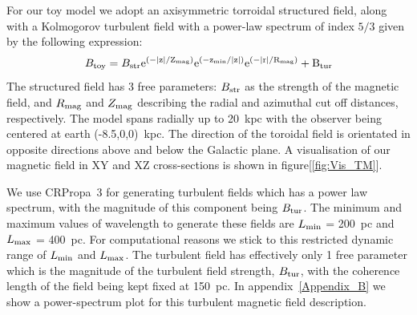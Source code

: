 \documentclass[usenatbib]{mnras}
\begin{document}
For our toy model we adopt an axisymmetric torroidal structured field, along with a Kolmogorov turbulent field with a power-law spectrum of index $5/3$ given by the following expression:
\begin{equation}\label{TM_equation}
B_{\rm{toy}}= B_{\rm{str}}\rm{e}^{{(-|z|}/Z_{\rm{mag}})} \rm{e}^{(-z_{\rm{min}}/|z|)}\rm{e}^{(-|r|/R_{\rm{mag}})} + B_{\rm{tur}}
\end{equation}
The structured field has 3 free parameters: $B_{\rm str}$ as the strength of the magnetic field, and $R_{\rm {mag}}$ and $Z_{\rm {mag}}$ describing the radial and azimuthal cut off distances, respectively. The model spans radially up to 20~kpc with the observer being centered at earth (-8.5,0,0)~kpc. The direction of the toroidal field is orientated in opposite directions above and below the Galactic plane. A visualisation of our magnetic field in XY and XZ cross-sections is shown in figure[\ref{fig:Vis_TM}]. 

We use CRPropa~3 \cite{CRPropa3_2016} for generating turbulent fields which has a power law spectrum, with the magnitude of this component being $B_{\rm{tur}}$. 
The minimum and maximum values of wavelength to generate these fields are  $L_{\rm min}$ = 200~pc and $L_{\rm max}$ = 400~pc. For computational reasons we stick to this restricted dynamic range of $L_{\rm min}$ and $L_{\rm max}$. The turbulent field has effectively only 1 free parameter which is the magnitude of the turbulent field strength, $ B_{\rm tur}$, with the coherence length of the field being kept fixed at 150~pc.
In appendix~\ref{Appendix_B} we show a power-spectrum plot for this turbulent magnetic field description.
\end{document}
